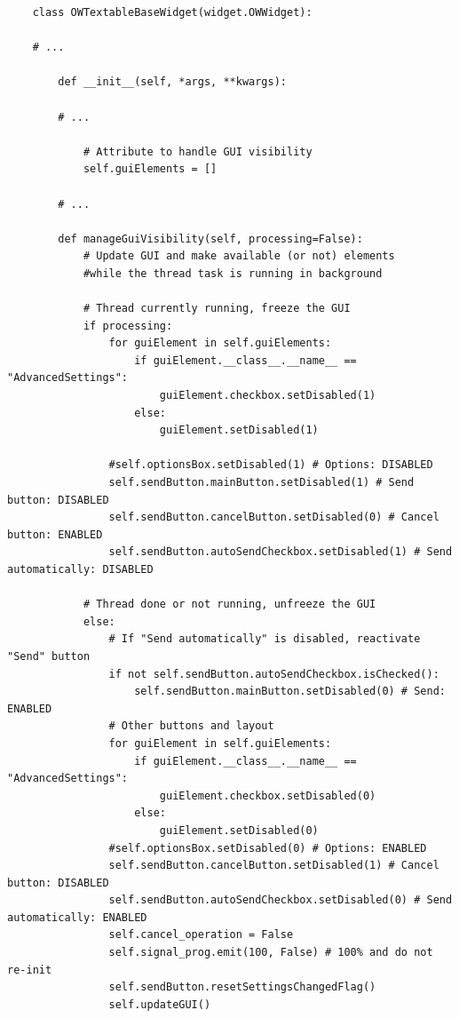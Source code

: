 \documentclass{article}
\begin{document}
\begin{verbatim}
    class OWTextableBaseWidget(widget.OWWidget):

    # ...

        def __init__(self, *args, **kwargs):

        # ...

            # Attribute to handle GUI visibility
            self.guiElements = []

        # ...

        def manageGuiVisibility(self, processing=False):
            # Update GUI and make available (or not) elements
            #while the thread task is running in background
    
            # Thread currently running, freeze the GUI
            if processing:
                for guiElement in self.guiElements:
                    if guiElement.__class__.__name__ == "AdvancedSettings":
                        guiElement.checkbox.setDisabled(1)
                    else:
                        guiElement.setDisabled(1)
    
                #self.optionsBox.setDisabled(1) # Options: DISABLED
                self.sendButton.mainButton.setDisabled(1) # Send button: DISABLED
                self.sendButton.cancelButton.setDisabled(0) # Cancel button: ENABLED
                self.sendButton.autoSendCheckbox.setDisabled(1) # Send automatically: DISABLED
    
            # Thread done or not running, unfreeze the GUI
            else:
                # If "Send automatically" is disabled, reactivate "Send" button
                if not self.sendButton.autoSendCheckbox.isChecked():
                    self.sendButton.mainButton.setDisabled(0) # Send: ENABLED
                # Other buttons and layout
                for guiElement in self.guiElements:
                    if guiElement.__class__.__name__ == "AdvancedSettings":
                        guiElement.checkbox.setDisabled(0)
                    else:
                        guiElement.setDisabled(0)
                #self.optionsBox.setDisabled(0) # Options: ENABLED
                self.sendButton.cancelButton.setDisabled(1) # Cancel button: DISABLED
                self.sendButton.autoSendCheckbox.setDisabled(0) # Send automatically: ENABLED
                self.cancel_operation = False
                self.signal_prog.emit(100, False) # 100% and do not re-init
                self.sendButton.resetSettingsChangedFlag()
                self.updateGUI()
\end{verbatim}
\end{document}
